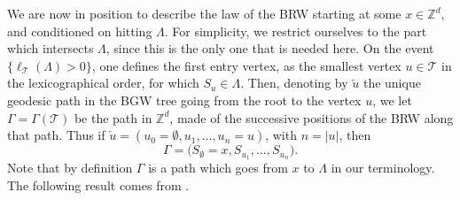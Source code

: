 \documentclass[11pt]{article}
\numberwithin{equation}{section}
\theoremstyle{plain}
\theoremstyle{definition}
\newcommand{\1}{{\text{\Large $\mathfrak 1$}}}
\begin{document}
We are now in position to describe the law of the BRW starting
at some $x\in \mathbb Z^d$, and
conditioned on hitting $\Lambda$.
For simplicity, we restrict ourselves to the part which intersects $\Lambda$,
since this is the only one that is needed here.
On the event $\{\ell_{\mathcal T}(\Lambda)>0\}$,
one defines the first entry vertex, as the smallest vertex
$u\in \mathcal T$ in the lexicographical order, for which $S_u\in \Lambda$.
Then, denoting by $\overleftarrow{u}$
the unique geodesic path in the BGW tree going from the root to
the vertex $u$, we let $\Gamma=\Gamma(\mathcal T)$
be the path in $\mathbb Z^d$,
made of the successive positions of the BRW along that path.
Thus if \hbox{$\overleftarrow{u} = (u_0=\emptyset, u_1,\dots,u_n=u)$},
with $n=|u|$, then
\[
\Gamma=\big(S_\emptyset=x,S_{u_1},\dots,S_{u_n}\big).
\]
Note that by definition $\Gamma$
is a path which goes from $x$ to $\Lambda$ in our terminology.
The following result comes from \cite[Prop.\,2.4]{Zhu3}.
\end{document}

